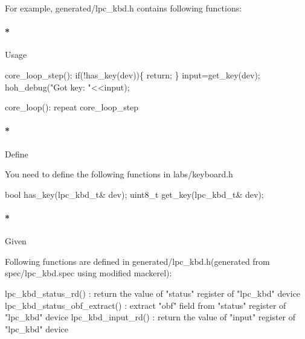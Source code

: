 \documentclass[]{article}
\newenvironment{Shaded}{}{}
\newcommand{\DataTypeTok}[1]{\textcolor[rgb]{0.50,0.00,0.00}{{#1}}}
\newcommand{\StringTok}[1]{\textcolor[rgb]{0.87,0.00,0.00}{{#1}}}
\newcommand{\ControlFlowTok}[1]{{#1}}
\newcommand{\NormalTok}[1]{{#1}}
\let\oldparagraph\paragraph
\renewcommand{\paragraph}[1]{\oldparagraph{#1}\mbox{}}
\begin{document}
For example, generated/lpc\_kbd.h contains following functions:

\paragraph*{Usage}\label{usage-2}

\begin{Shaded}
\begin{Highlighting}[]
    \NormalTok{core_loop_step():}
        \ControlFlowTok{if}\NormalTok{(!has_key(dev))\{}
          \ControlFlowTok{return}\NormalTok{;}
        \NormalTok{\}}
        \NormalTok{input=get_key(dev);}
        \NormalTok{hoh_debug(}\StringTok{"Got key: "}\NormalTok{<<input);}

    \NormalTok{core_loop():}
        \NormalTok{repeat core_loop_step}
\end{Highlighting}
\end{Shaded}

\paragraph*{Define}\label{define-2}

You need to define the following functions in labs/keyboard.h

\begin{Shaded}
\begin{Highlighting}[]
    \NormalTok{bool has_key(lpc_kbd_t& dev);}
    \DataTypeTok{uint8_t} \NormalTok{get_key(lpc_kbd_t& dev);}
\end{Highlighting}
\end{Shaded}

\paragraph*{Given}\label{given-2}

Following functions are defined in generated/lpc\_kbd.h(generated from
spec/lpc\_kbd.spec using modified mackerel):

\begin{Shaded}
\begin{Highlighting}[]
    \NormalTok{lpc_kbd_status_rd()           : }\ControlFlowTok{return} \NormalTok{the value of }\StringTok{"status"} \DataTypeTok{register}  \NormalTok{of }\StringTok{"lpc_kbd"} \NormalTok{device}
    \NormalTok{lpc_kbd_status_obf_extract()  : extract }\StringTok{"obf"} \NormalTok{field from }\StringTok{"status"} \DataTypeTok{register}   \NormalTok{of }\StringTok{"lpc_kbd"} \NormalTok{device}
    \NormalTok{lpc_kbd_input_rd()            : }\ControlFlowTok{return} \NormalTok{the value of }\StringTok{"input"} \DataTypeTok{register} \NormalTok{of }\StringTok{"lpc_kbd"} \NormalTok{device}
\end{Highlighting}
\end{Shaded}
\end{document}
